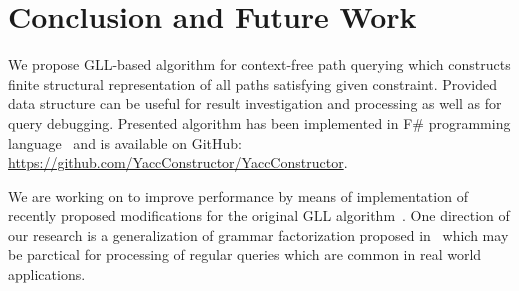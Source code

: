 \section{Conclusion and Future Work}

We propose GLL-based algorithm for context-free path querying which constructs finite structural representation of all paths satisfying given constraint.
Provided data structure can be useful for result investigation and processing as well as for query debugging.
Presented algorithm has been implemented in F\# programming language~\cite{FSharp} and is available on GitHub: \url{https://github.com/YaccConstructor/YaccConstructor}.

We are working on to improve performance by means of implementation of recently proposed modifications for the original GLL algorithm~\cite{FGLL,FastPracticalGLL}.
One direction of our research is a generalization of grammar factorization proposed in~\cite{FGLL} which may be parctical for processing of regular queries which are common in real world applications.

